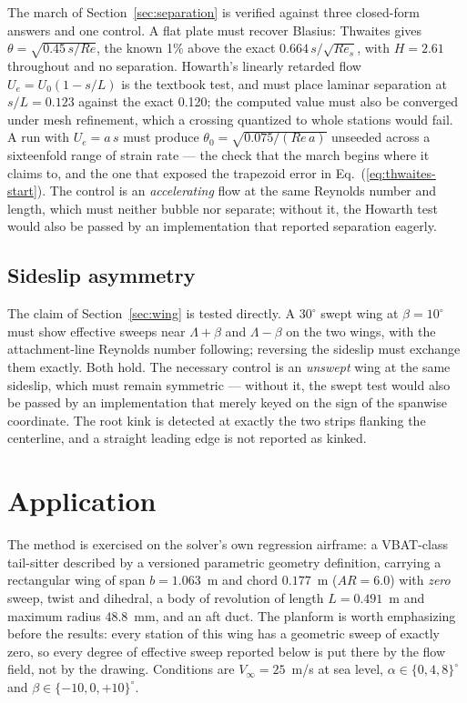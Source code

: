 \documentclass[submit]{aiaa-tc}%
\newcommand{\eqnref}[1]{(\ref{#1})}
\begin{document}
The march of Section~\ref{sec:separation} is verified against three
closed-form answers and one control. A flat plate must recover Blasius:
Thwaites gives $\theta = \sqrt{0.45\,s/Re}$, the known 1\% above the exact
$0.664\,s/\sqrt{Re_s}$, with $H = 2.61$ throughout and no separation.
Howarth's linearly retarded flow $U_e = U_0(1 - s/L)$ is the textbook
test, and must place laminar separation at $s/L = 0.123$ against the exact
0.120; the computed value must also be converged under mesh refinement,
which a crossing quantized to whole stations would fail. A run with
$U_e = a\,s$ must produce $\theta_0 = \sqrt{0.075/(Re\,a)}$ unseeded
across a sixteenfold range of strain rate --- the check that the march
begins where it claims to, and the one that exposed the trapezoid error
in Eq.~\eqnref{eq:thwaites-start}. The control is an \emph{accelerating}
flow at the same Reynolds number and length, which must neither bubble
nor separate; without it, the Howarth test would also be passed by an
implementation that reported separation eagerly.

\subsection{Sideslip asymmetry}

The claim of Section~\ref{sec:wing} is tested directly. A $30^\circ$ swept
wing at $\beta = 10^\circ$ must show effective sweeps near $\Lambda +
\beta$ and $\Lambda - \beta$ on the two wings, with the attachment-line
Reynolds number following; reversing the sideslip must exchange them
exactly. Both hold. The necessary control is an \emph{unswept} wing at the
same sideslip, which must remain symmetric --- without it, the swept test
would also be passed by an implementation that merely keyed on the sign of
the spanwise coordinate. The root kink is detected at exactly the two
strips flanking the centerline, and a straight leading edge is not
reported as kinked.

\section{Application}
\label{sec:application}


The method is exercised on the solver's own regression airframe: a
VBAT-class tail-sitter described by a versioned parametric geometry
definition,
carrying a rectangular wing of span $b = 1.063$~m and chord
$0.177$~m ($A\!R = 6.0$) with \emph{zero} sweep, twist and dihedral, a
body of revolution of length $L = 0.491$~m and maximum radius
$48.8$~mm, and an aft duct. The planform is worth emphasizing before
the results: every station of this wing has a geometric sweep of
exactly zero, so every degree of effective sweep reported below is put
there by the flow field, not by the drawing. Conditions are $V_\infty
= 25$~m/s at sea level, $\alpha \in \{0, 4, 8\}^\circ$ and $\beta \in
\{-10, 0, +10\}^\circ$.
\end{document}
